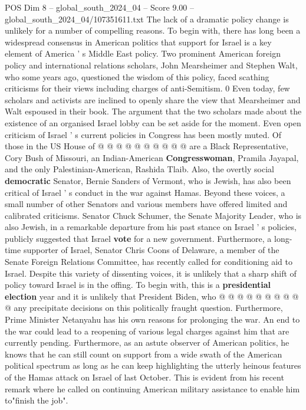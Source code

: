 \begin{textsample}{POS Dim 8 – global\_south\_2024\_04 – Score 9.00 – global\_south\_2024\_04/107351611.txt}
The lack of a dramatic policy change is unlikely for a number of compelling reasons.
To begin with, there has long been a widespread consensus in American politics that support for Israel is a key element of America ' s Middle East policy.
Two prominent American foreign policy and international relations scholars, John Mearsheimer and Stephen Walt, who some years ago, questioned the wisdom of this policy, faced scathing criticisms for their views including charges of anti-Semitism. 0 Even today, few scholars and activists are inclined to openly share the view that Mearsheimer and Walt espoused in their book.
The argument that the two scholars made about the existence of an organised Israel lobby can be set aside for the moment.
Even open criticism of Israel ' s current policies in Congress has been mostly muted.
Of those in the US House of @ @ @ @ @ @ @ @ @ @ are a Black Representative, Cory Bush of Missouri, an Indian-American \textbf{Congresswoman}, Pramila Jayapal, and the only Palestinian-American, Rashida Tlaib.
Also, the overtly social \textbf{democratic} Senator, Bernie Sanders of Vermont, who is Jewish, has also been critical of Israel ' s conduct in the war against Hamas.
Beyond these voices, a small number of other Senators and various members have offered limited and calibrated criticisms.
Senator Chuck Schumer, the Senate Majority Leader, who is also Jewish, in a remarkable departure from his past stance on Israel ' s policies, publicly suggested that Israel \textbf{vote} for a new government.
Furthermore, a long-time supporter of Israel, Senator Chris Coons of Delaware, a member of the Senate Foreign Relations Committee, has recently called for conditioning aid to Israel.
Despite this variety of dissenting voices, it is unlikely that a sharp shift of policy toward Israel is in the offing.
To begin with, this is a \textbf{presidential} \textbf{election} year and it is unlikely that President Biden, who @ @ @ @ @ @ @ @ @ @ any precipitate decisions on this politically fraught question.
Furthermore, Prime Minister Netanyahu has his own reasons for prolonging the war.
An end to the war could lead to a reopening of various legal charges against him that are currently pending.
Furthermore, as an astute observer of American politics, he knows that he can still count on support from a wide swath of the American political spectrum as long as he can keep highlighting the utterly heinous features of the Hamas attack on Israel of last October.
This is evident from his recent remark where he called on continuing American military assistance to enable him to"finish the job".

\end{textsample}
